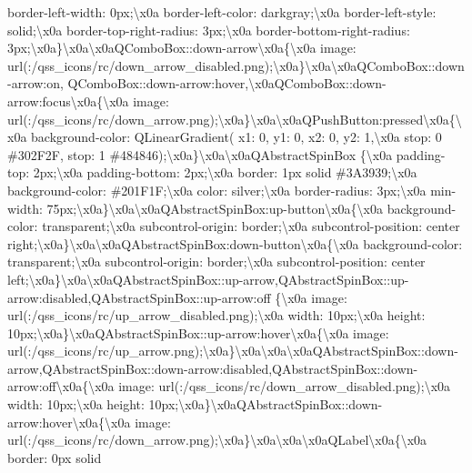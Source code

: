 \begin{DoxyCompactItemize}
border-\/left-\/width\+: 0px;\textbackslash{}x0a border-\/left-\/color\+: darkgray;\textbackslash{}x0a border-\/left-\/style\+: solid;\textbackslash{}x0a border-\/top-\/right-\/radius\+: 3px;\textbackslash{}x0a border-\/bottom-\/right-\/radius\+: 3px;\textbackslash{}x0a\}\textbackslash{}x0a\textbackslash{}x0a\+Q\+Combo\+Box\+::down-\/arrow\textbackslash{}x0a\{\textbackslash{}x0a image\+: url(\+:/qss\+\_\+icons/rc/down\+\_\+arrow\+\_\+disabled.\+png);\textbackslash{}x0a\}\textbackslash{}x0a\textbackslash{}x0a\+Q\+Combo\+Box\+::down-\/arrow\+:on, Q\+Combo\+Box\+::down-\/arrow\+:hover,\textbackslash{}x0a\+Q\+Combo\+Box\+::down-\/arrow\+:focus\textbackslash{}x0a\{\textbackslash{}x0a image\+: url(\+:/qss\+\_\+icons/rc/down\+\_\+arrow.\+png);\textbackslash{}x0a\}\textbackslash{}x0a\textbackslash{}x0a\+Q\+Push\+Button\+:pressed\textbackslash{}x0a\{\textbackslash{}x0a background-\/color\+: Q\+Linear\+Gradient( x1\+: 0, y1\+: 0, x2\+: 0, y2\+: 1,\textbackslash{}x0a stop\+: 0 \#302\+F2\+F, stop\+: 1 \#484846);\textbackslash{}x0a\}\textbackslash{}x0a\textbackslash{}x0a\+Q\+Abstract\+Spin\+Box \{\textbackslash{}x0a padding-\/top\+: 2px;\textbackslash{}x0a padding-\/bottom\+: 2px;\textbackslash{}x0a border\+: 1px solid \#3\+A3939;\textbackslash{}x0a background-\/color\+: \#201\+F1\+F;\textbackslash{}x0a color\+: silver;\textbackslash{}x0a border-\/radius\+: 3px;\textbackslash{}x0a min-\/width\+: 75px;\textbackslash{}x0a\}\textbackslash{}x0a\textbackslash{}x0a\+Q\+Abstract\+Spin\+Box\+:up-\/button\textbackslash{}x0a\{\textbackslash{}x0a background-\/color\+: transparent;\textbackslash{}x0a subcontrol-\/origin\+: border;\textbackslash{}x0a subcontrol-\/position\+: center right;\textbackslash{}x0a\}\textbackslash{}x0a\textbackslash{}x0a\+Q\+Abstract\+Spin\+Box\+:down-\/button\textbackslash{}x0a\{\textbackslash{}x0a background-\/color\+: transparent;\textbackslash{}x0a subcontrol-\/origin\+: border;\textbackslash{}x0a subcontrol-\/position\+: center left;\textbackslash{}x0a\}\textbackslash{}x0a\textbackslash{}x0a\+Q\+Abstract\+Spin\+Box\+::up-\/arrow,\+Q\+Abstract\+Spin\+Box\+::up-\/arrow\+:disabled,\+Q\+Abstract\+Spin\+Box\+::up-\/arrow\+:off \{\textbackslash{}x0a image\+: url(\+:/qss\+\_\+icons/rc/up\+\_\+arrow\+\_\+disabled.\+png);\textbackslash{}x0a width\+: 10px;\textbackslash{}x0a height\+: 10px;\textbackslash{}x0a\}\textbackslash{}x0a\+Q\+Abstract\+Spin\+Box\+::up-\/arrow\+:hover\textbackslash{}x0a\{\textbackslash{}x0a image\+: url(\+:/qss\+\_\+icons/rc/up\+\_\+arrow.\+png);\textbackslash{}x0a\}\textbackslash{}x0a\textbackslash{}x0a\textbackslash{}x0a\+Q\+Abstract\+Spin\+Box\+::down-\/arrow,\+Q\+Abstract\+Spin\+Box\+::down-\/arrow\+:disabled,\+Q\+Abstract\+Spin\+Box\+::down-\/arrow\+:off\textbackslash{}x0a\{\textbackslash{}x0a image\+: url(\+:/qss\+\_\+icons/rc/down\+\_\+arrow\+\_\+disabled.\+png);\textbackslash{}x0a width\+: 10px;\textbackslash{}x0a height\+: 10px;\textbackslash{}x0a\}\textbackslash{}x0a\+Q\+Abstract\+Spin\+Box\+::down-\/arrow\+:hover\textbackslash{}x0a\{\textbackslash{}x0a image\+: url(\+:/qss\+\_\+icons/rc/down\+\_\+arrow.\+png);\textbackslash{}x0a\}\textbackslash{}x0a\textbackslash{}x0a\textbackslash{}x0a\+Q\+Label\textbackslash{}x0a\{\textbackslash{}x0a border\+: 0px solid 
\end{DoxyCompactItemize}
